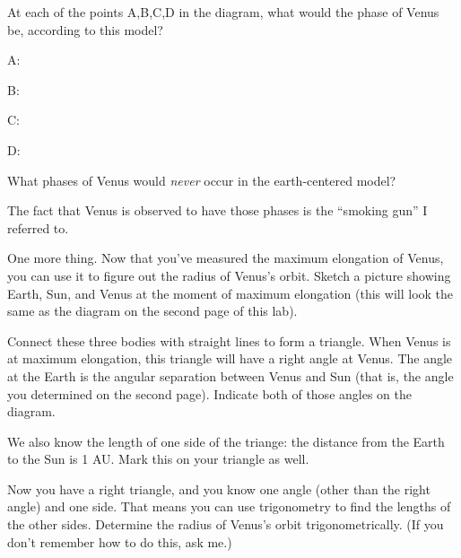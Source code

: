 At each of the points A,B,C,D in the diagram, what would the phase
of Venus be, according to this model?

A:

B:

C: 

D:

What phases of Venus would {\it never} occur in the earth-centered
model?

\answerspace{ 0.7in}

The fact that Venus is observed to have those phases is the ``smoking
gun'' I referred to.

One more thing.  Now that you've measured the maximum elongation of
Venus, you can use it to figure out the radius of Venus's orbit.
Sketch a picture showing Earth, Sun, and Venus at the moment of 
maximum elongation (this will look the same as the diagram on the
second page of this lab).  

\answerspace{ 2in}

Connect these three bodies with straight lines to form a triangle.
When Venus is at maximum elongation, this triangle will have a right
angle at Venus.  The angle at the Earth is the angular separation
between Venus and Sun (that is, the angle you determined on the second page).
Indicate both of those angles on the diagram.

We also know the length of one side of the triange: the distance from
the Earth to the Sun is 1 AU.  Mark this on your triangle as well.

Now you have a right triangle, and you know one angle (other
than the right angle) and one side.
That means you can use trigonometry to find the lengths of the
other sides.  Determine the radius of Venus's orbit trigonometrically.
(If you don't remember how to do this, ask me.)



